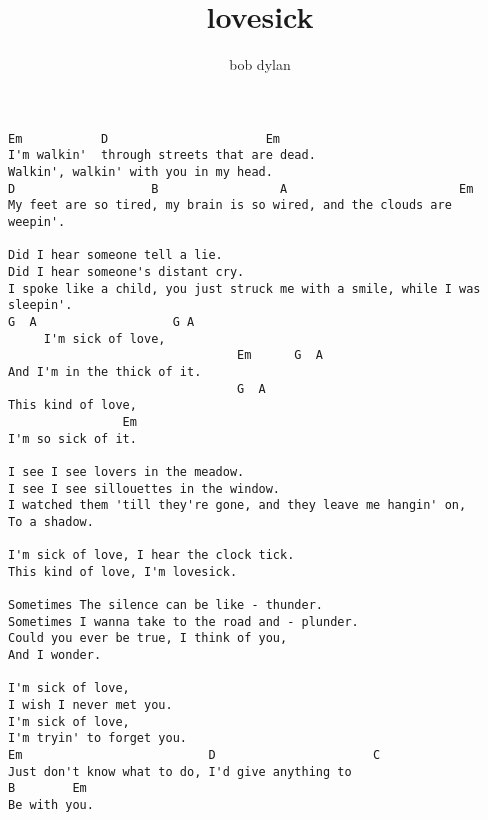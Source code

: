 \author{bob dylan}
\title{lovesick}
\maketitle
\begin{verbatim}
Em           D                      Em
I'm walkin'  through streets that are dead.
Walkin', walkin' with you in my head.
D                   B                 A                        Em
My feet are so tired, my brain is so wired, and the clouds are weepin'.

Did I hear someone tell a lie.
Did I hear someone's distant cry.
I spoke like a child, you just struck me with a smile, while I was sleepin'.
G  A                   G A
     I'm sick of love,
                                Em      G  A
And I'm in the thick of it.
                                G  A
This kind of love,
                Em
I'm so sick of it.

I see I see lovers in the meadow.
I see I see sillouettes in the window.
I watched them 'till they're gone, and they leave me hangin' on,
To a shadow.

I'm sick of love, I hear the clock tick.
This kind of love, I'm lovesick.

Sometimes The silence can be like - thunder.
Sometimes I wanna take to the road and - plunder.
Could you ever be true, I think of you,
And I wonder.

I'm sick of love,
I wish I never met you.
I'm sick of love,
I'm tryin' to forget you.
Em                          D                      C
Just don't know what to do, I'd give anything to
B        Em
Be with you.
\end{verbatim}